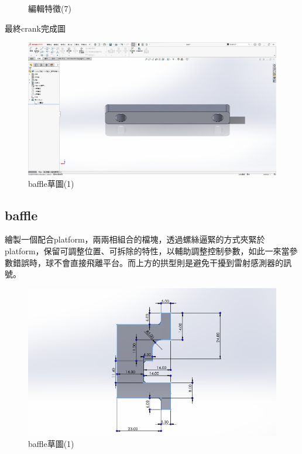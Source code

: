 \begin{figure}[h!]
\begin{minipage}[b]{0.35\textwidth}
        \caption{編輯特徵(7)}
        \label{fig:feature1}
    \end{minipage}
\end{figure}

最終crank完成圖

\begin{figure}[htbp]
    \centering
    \includegraphics[width=1\textwidth]{./../images/螢幕擷取畫面 2024-05-25 230501}
    \caption{baffle草圖(1)}
\end{figure}

\newpage

\subsection*{baffle}

繪製一個配合platform，兩兩相組合的檔塊，透過螺絲逼緊的方式夾緊於platform，保留可調整位置、可拆除的特性，以輔助調整控制參數，如此一來當參數錯誤時，球不會直接飛離平台。而上方的拱型則是避免干擾到雷射感測器的訊號。

\begin{figure}[htbp]
    \centering
    \includegraphics[width=1\textwidth]{./../images/螢幕擷取畫面 2024-05-25 224335}
    \caption{baffle草圖(1)}
\end{figure}

